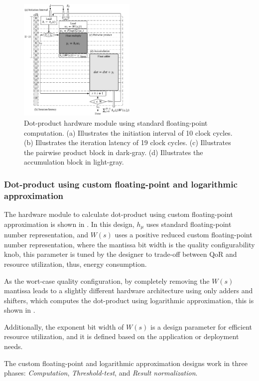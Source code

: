 \begin{figure}[t!]
	\centering
	\includegraphics[width=0.5\textwidth]{../figures/dot_product_float.pdf}
	\caption{Dot-product hardware module using standard floating-point computation. (a) Illustrates the initiation interval of 10 clock cycles. (b) Illustrates the iteration latency of 19 clock cycles. (c) Illustrates the pairwise product block in dark-gray. (d) Illustrates the accumulation block in light-gray.}
	\label{fig:dot_product_float}
\end{figure}

\subsubsection{Dot-product using custom floating-point and logarithmic approximation}
 The hardware module to calculate dot-product using custom floating-point approximation is shown in . In this design, $h_\mu$ uses standard floating-point number representation, and $W(s)$ uses a positive reduced custom floating-point number representation, where the mantissa bit width is the quality configurability knob, this parameter is tuned by the designer to trade-off between QoR and resource utilization, thus, energy consumption.
 
 As the wort-case quality configuration, by completely removing the $W(s)$ mantissa leads to a slightly different hardware architecture using only adders and shifters, which computes the dot-product using logarithmic approximation, this is shown in .
 
Additionally, the exponent bit width of $W(s)$ is a design parameter for efficient resource utilization, and it is defined based on the application or deployment needs.
 
 The custom floating-point and logarithmic approximation designs work in three phases: \emph{Computation}, \emph{Threshold-test}, and \emph{Result normalization}.
 
